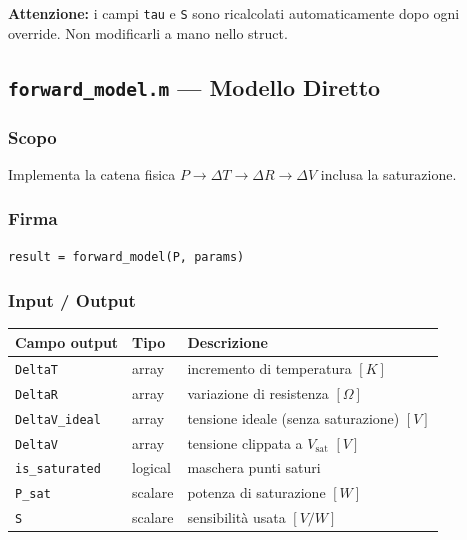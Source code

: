 \documentclass[11pt,a4paper]{article}
\begin{document}
\begin{warnbox}
\textbf{Attenzione:} i campi \texttt{tau} e \texttt{S} sono ricalcolati
automaticamente dopo ogni override. Non modificarli a mano nello struct.
\end{warnbox}

\subsection{\texttt{forward\_model.m} --- Modello Diretto}

\subsubsection*{Scopo}
Implementa la catena fisica $P \to \Delta T \to \Delta R \to \Delta V$
inclusa la saturazione.

\subsubsection*{Firma}
\begin{lstlisting}
result = forward_model(P, params)
\end{lstlisting}

\subsubsection*{Input / Output}

\begin{center}
\begin{tabular}{lll}
\toprule
Campo output & Tipo & Descrizione \\
\midrule
\texttt{DeltaT}       & array & incremento di temperatura $[K]$ \\
\texttt{DeltaR}       & array & variazione di resistenza $[\Omega]$ \\
\texttt{DeltaV\_ideal}& array & tensione ideale (senza saturazione) $[V]$ \\
\texttt{DeltaV}       & array & tensione clippata a $V_{\text{sat}}$ $[V]$ \\
\texttt{is\_saturated}& logical & maschera punti saturi \\
\texttt{P\_sat}       & scalare & potenza di saturazione $[W]$ \\
\texttt{S}            & scalare & sensibilità usata $[V/W]$ \\
\bottomrule
\end{tabular}
\end{center}
\end{document}
